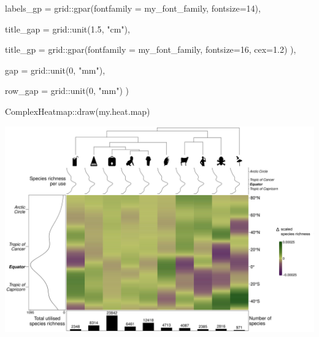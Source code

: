 \documentclass[
]{article}
\newenvironment{Shaded}{\begin{snugshade}}{\end{snugshade}}
\newcommand{\AttributeTok}[1]{\textcolor[rgb]{0.77,0.63,0.00}{#1}}
\newcommand{\DecValTok}[1]{\textcolor[rgb]{0.00,0.00,0.81}{#1}}
\newcommand{\FloatTok}[1]{\textcolor[rgb]{0.00,0.00,0.81}{#1}}
\newcommand{\FunctionTok}[1]{\textcolor[rgb]{0.00,0.00,0.00}{#1}}
\newcommand{\NormalTok}[1]{#1}
\newcommand{\SpecialCharTok}[1]{\textcolor[rgb]{0.00,0.00,0.00}{#1}}
\newcommand{\StringTok}[1]{\textcolor[rgb]{0.31,0.60,0.02}{#1}}
\begin{document}
\begin{Shaded}
\begin{Highlighting}[]
    \AttributeTok{labels\_gp =}\NormalTok{ grid}\SpecialCharTok{::}\FunctionTok{gpar}\NormalTok{(}\AttributeTok{fontfamily =}\NormalTok{ my\_font\_family,}
                           \AttributeTok{fontsize=}\DecValTok{14}\NormalTok{),}

    \AttributeTok{title\_gap =}\NormalTok{ grid}\SpecialCharTok{::}\FunctionTok{unit}\NormalTok{(}\FloatTok{1.5}\NormalTok{, }\StringTok{"cm"}\NormalTok{),}

    \AttributeTok{title\_gp =}\NormalTok{ grid}\SpecialCharTok{::}\FunctionTok{gpar}\NormalTok{(}\AttributeTok{fontfamily =}\NormalTok{ my\_font\_family,}
                          \AttributeTok{fontsize=}\DecValTok{16}\NormalTok{, }\AttributeTok{cex=}\FloatTok{1.2}\NormalTok{)}
\NormalTok{  ),}

  \AttributeTok{gap =}\NormalTok{ grid}\SpecialCharTok{::}\FunctionTok{unit}\NormalTok{(}\DecValTok{0}\NormalTok{, }\StringTok{"mm"}\NormalTok{),}

  \AttributeTok{row\_gap =}\NormalTok{ grid}\SpecialCharTok{::}\FunctionTok{unit}\NormalTok{(}\DecValTok{0}\NormalTok{, }\StringTok{"mm"}\NormalTok{)}
\NormalTok{)}

\NormalTok{ComplexHeatmap}\SpecialCharTok{::}\FunctionTok{draw}\NormalTok{(my.heat.map)}
\end{Highlighting}
\end{Shaded}

\begin{center}\includegraphics{heatmap_SR} \end{center}
\end{document}
